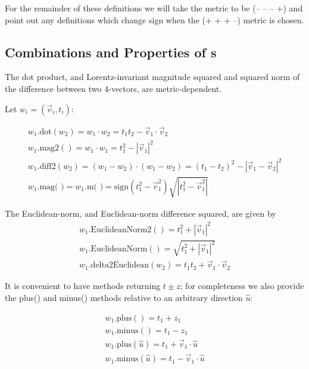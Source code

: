 \documentclass[twoside,12pt]{article}
\def \LV {{\tt HepLorentzVector}}
\begin{document}
For the remainder of these definitions we will take the metric to be
(-- -- -- +) and point out any definitions which change sign when the
(+ + + --) metric is chosen.


\subsection{Combinations and Properties of \protect\LV s}

The dot product, and Lorentz-invariant magnitude squared and
squared norm of the difference between two 4-vectors, are metric-dependent.

Let $w_i = ( \vec{v}_i, t_i )$:

\begin{eqnarray}
\label{eq:wdot:2}
  w_1\mbox{.dot}(w_2) = w_1 \cdot w_2 = t_1 t_2 - \vec{v}_1 \cdot \vec{v}_2 \\
\label{eq:wmag2}
  w_1\mbox{.mag2}() = w_1 \cdot w_1 = t_1^2 - |\vec{v}_1|^2 \\
\label{eq:wdiff2}
  w_1\mbox{.diff2}(w_2) = (w_1-w_2) \cdot (w_1-w_2) =
	(t_1 - t_2)^2 -   \left| \vec{v}_1 - \vec{v}_2 \right| ^2 \\
\label{eq:wmag}
w_1\mbox{.mag(~)} = w_1\mbox{.m(~)} = 
	\mbox{sign}(t_1^2 - \vec{v}_1^2) 
		\sqrt{\left|t_1^2 - \vec{v}_1^2\right|} 
\end{eqnarray}

The Euclidean-norm, and Euclidean-norm difference squared, are given by
\begin{eqnarray}
\label{eq:wENorm2}
  w_1\mbox{.EuclideanNorm2}() = t_1^2 + |\vec{v}_1|^2 \\
\label{eq:wENorm}
  w_1\mbox{.EuclideanNorm}() = \sqrt{t_1^2 + |\vec{v}_1|^2} \\
\label{eq:wdelta2E}
  w_1\mbox{.delta2Euclidean}(w_2) = t_1 t_2 + \vec{v}_1 \cdot \vec{v}_2
\end{eqnarray}

It is convenient to have methods returning $t \pm z$; for completeness
we also provide the plus() and minus() methods relative to an arbitrary
direction $\hat{u}$:

\begin{eqnarray}
\label{eq:wplus}
  w_1\mbox{.plus}() = t_1 + z_1 \\
\label{eq:wminus}
  w_1\mbox{.minus}() = t_1 - z_1 \\
\label{eq:wplus:2}
  w_1\mbox{.plus}(\hat{u}) = t_1 + \vec{v}_1 \cdot \hat{u} \\
\label{eq:wminus:2}
  w_1\mbox{.minus}(\hat{u}) = t_1 - \vec{v}_1 \cdot \hat{u}
\end{eqnarray}
\end{document}
